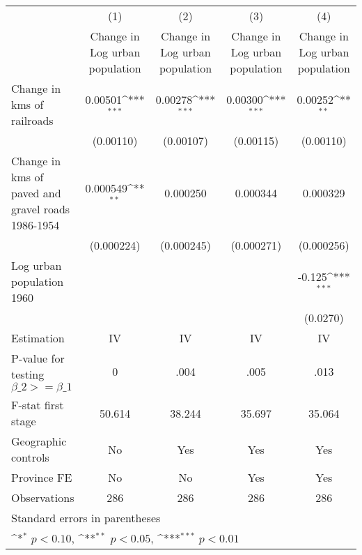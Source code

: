 {
\def\sym#1{\ifmmode^{#1}\else\(^{#1}\)\fi}
\begin{tabular}{l*{4}{c}}
\hline\hline
                &\multicolumn{1}{c}{(1)}&\multicolumn{1}{c}{(2)}&\multicolumn{1}{c}{(3)}&\multicolumn{1}{c}{(4)}\\
                &\multicolumn{1}{c}{Change in Log urban population}&\multicolumn{1}{c}{Change in Log urban population}&\multicolumn{1}{c}{Change in Log urban population}&\multicolumn{1}{c}{Change in Log urban population}\\
\hline
Change in kms of railroads&  0.00501\sym{***}&  0.00278\sym{***}&  0.00300\sym{***}&  0.00252\sym{**} \\
                &(0.00110)         &(0.00107)         &(0.00115)         &(0.00110)         \\
[1em]
Change in kms of paved and gravel roads 1986-1954& 0.000549\sym{**} & 0.000250         & 0.000344         & 0.000329         \\
                &(0.000224)         &(0.000245)         &(0.000271)         &(0.000256)         \\
[1em]
Log urban population 1960&                  &                  &                  &   -0.125\sym{***}\\
                &                  &                  &                  & (0.0270)         \\
\hline
Estimation      &       IV         &       IV         &       IV         &       IV         \\
P-value for testing $\beta\_2 >= \beta\_1$&        0         &     .004         &     .005         &     .013         \\
F-stat first stage&   50.614         &   38.244         &   35.697         &   35.064         \\
Geographic controls&       No         &      Yes         &      Yes         &      Yes         \\
Province FE     &       No         &       No         &      Yes         &      Yes         \\
Observations    &      286         &      286         &      286         &      286         \\
\hline\hline
\multicolumn{5}{l}{\footnotesize Standard errors in parentheses}\\
\multicolumn{5}{l}{\footnotesize \sym{*} \(p<0.10\), \sym{**} \(p<0.05\), \sym{***} \(p<0.01\)}\\
\end{tabular}
}
